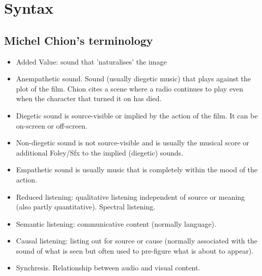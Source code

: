 
\chapter{Syntax}
\label{syntax}

\section{Michel Chion's terminology}
\begin{itemize}
\item Added Value: sound that 'naturalises' the image
\item Anempathetic sound. Sound (usually diegetic music) that plays against the plot of the film. Chion cites a scene where a radio continues to play even when the character that turned it on has died.
\item Diegetic sound is source-visible or implied by the action of the film. It can be on-screen or off-screen.
\item Non-diegetic sound is not source-visible and is usually the musical score or additional Foley/Sfx to the implied (diegetic) sounds.
\item Empathetic sound is usually music that is completely within the mood of the action.
\item Reduced listening: qualitative listening independent of source or meaning (also partly quantitative). Spectral listening.
\item Semantic listening: communicative content (normally language).
\item Causal listening: listing out for source or cause (normally associated with the sound of what is seen but often used to pre-figure what is about to appear). 
\item Synchresis. Relationship between audio and visual content.
\end{itemize}

